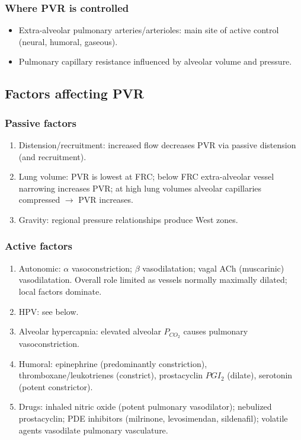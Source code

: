 \documentclass[11pt,a4paper]{article}
\begin{document}
\subsubsection{Where PVR is controlled}
\begin{itemize}
  \item Extra-alveolar pulmonary arteries/arterioles: main site of active control (neural, humoral, gaseous).
  \item Pulmonary capillary resistance influenced by alveolar volume and pressure.
\end{itemize}

\subsection{Factors affecting PVR}
\subsubsection{Passive factors}
\begin{enumerate}
  \item Distension/recruitment: increased flow decreases PVR via passive distension (and recruitment).
  \item Lung volume: PVR is lowest at FRC; below FRC extra-alveolar vessel narrowing increases PVR; at high lung volumes alveolar capillaries compressed \(\rightarrow\) PVR increases.
  \item Gravity: regional pressure relationships produce West zones.
\end{enumerate}

\subsubsection{Active factors}
\begin{enumerate}
  \item Autonomic: \(\alpha\) vasoconstriction; \(\beta\) vasodilatation; vagal ACh (muscarinic) vasodilatation. Overall role limited as vessels normally maximally dilated; local factors dominate.
  \item HPV: see below.
  \item Alveolar hypercapnia: elevated alveolar \(P_{CO_2}\) causes pulmonary vasoconstriction.
  \item Humoral: epinephrine (predominantly constriction), thromboxane/leukotrienes (constrict), prostacyclin \(PGI_2\) (dilate), serotonin (potent constrictor).
  \item Drugs: inhaled nitric oxide (potent pulmonary vasodilator); nebulized prostacyclin; PDE inhibitors (milrinone, levosimendan, sildenafil); volatile agents vasodilate pulmonary vasculature.
\end{enumerate}
\end{document}
